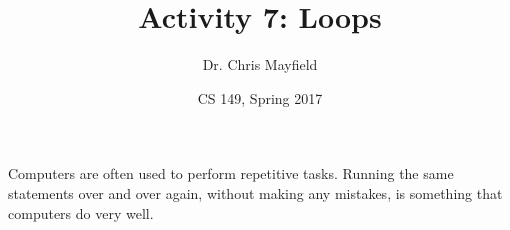 \documentclass[12pt]{article}
\title{Activity 7: Loops}
\author{Dr. Chris Mayfield}
\date{CS 149, Spring 2017}
\begin{document}
\maketitle

Computers are often used to perform repetitive tasks.
Running the same statements over and over again, without making any mistakes, is something that computers do very well.





\end{document}
